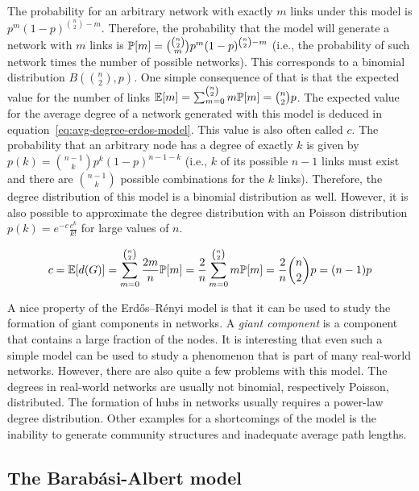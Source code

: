 The probability for an arbitrary network with exactly \(m\) links under this model is \(p^{m} (1-p)^{\binom{n}{2} - m}\).
Therefore, the probability that the model will generate a network with \(m\) links is \(\mathbb{P}[{m}] = \binom{\binom{n}{2}}{m} p^{m} (1-p)^{\binom{n}{2} - m}\) (i.e., the probability of such network times the number of possible networks).
This corresponds to  a binomial distribution \(B(\binom{n}{2}, p)\).
One simple consequence of that is that the expected value for the number of links \(\mathbb{E}[{m}] = \sum_{m=0}^{\binom{n}{2}} m \mathbb{P}[{m}] = \binom{n}{2} p\).
The expected value for the average degree of a network generated with this model is deduced in equation~\ref{eq:avg-degree-erdos-model}.
This value is also often called \(c\).
The probability that an arbitrary node has a degree of exactly \(k\) is given by \(p(k) = \binom{n-1}{k} p^{k} (1-p)^{n-1-k}\) (i.e., \(k\) of its possible \(n-1\) links must exist and there are \(\binom{n-1}{k}\) possible combinations for the \(k\) links).
Therefore, the degree distribution of this model is a binomial distribution as well.
However, it is also possible to approximate the degree distribution with an Poisson distribution \(p(k) = e^{-c} \frac{c^{k}}{k!}\) for large values of \(n\).

\begin{equation}
  c = \mathbb{E}[{d(G)}] = \sum_{m=0}^{\binom{n}{2}} \frac{2m}{n} \mathbb{P}[{m}] = \frac{2}{n} \sum_{m=0}^{\binom{n}{2}} m \mathbb{P}[{m}] = \frac{2}{n} \binom{n}{2} p = (n-1) p
  \label{eq:avg-degree-erdos-model}
\end{equation}

A nice property of the Erdős–Rényi model is that it can be used to study the formation of giant components in networks.
A \emph{giant component} is a component that contains a large fraction of the nodes.
It is interesting that even such a simple model can be used to study a phenomenon that is part of many real-world networks.
However, there are also quite a few problems with this model.
The degrees in real-world networks are usually not binomial, respectively Poisson, distributed.
The formation of hubs in networks usually requires a power-law degree distribution.
Other examples for a shortcomings of the model is the inability to generate community structures and inadequate average path lengths.


\subsection{The Barabási-Albert model}

